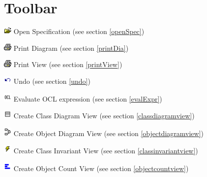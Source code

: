 \documentclass[a4paper,titlepage,oneside,final]{scrreprt} %
\begin{document}
\section{Toolbar}
\begin{description}
\item \includegraphics[width=0.03\textwidth]{Pictures/Open.png} Open Specification (see section \ref{openSpec})
\item \includegraphics[width=0.03\textwidth]{Pictures/Print.png} Print Diagram (see section \ref{printDia})
\item \includegraphics[width=0.03\textwidth]{Pictures/Print.png} Print View (see section \ref{printView})
\item \includegraphics[width=0.03\textwidth]{Pictures/Undo.png} Undo (see section \ref{undo})
\item \includegraphics[width=0.03\textwidth]{Pictures/OCL.png} Evaluate OCL expression (see section \ref{evalExpr})
\item \includegraphics[width=0.03\textwidth]{Pictures/Class.png} Create Class Diagram View (see section \ref{classdiagramview})
\item \includegraphics[width=0.03\textwidth]{Pictures/ObjectDiagram.png} Create Object Diagram View (see section \ref{objectdiagramview})
\item \includegraphics[width=0.03\textwidth]{Pictures/InvariantView.png} Create Class Invariant View (see section \ref{classinvariantview})
\item \includegraphics[width=0.03\textwidth]{Pictures/ObjectCountView.png} Create Object Count View (see section \ref{objectcountview})

\end{description}
\end{document}
